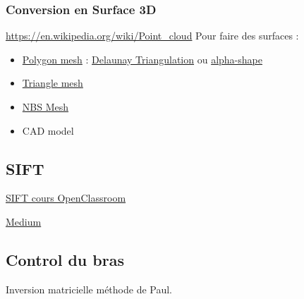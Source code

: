 \documentclass[12pt,a4paper]{article}
\begin{document}
\subsubsection{Conversion en Surface 3D}
\url{https://en.wikipedia.org/wiki/Point_cloud}
Pour faire des surfaces : 
\begin{itemize}
\item \href{https://en.wikipedia.org/wiki/Polygon_mesh}{Polygon mesh} : \href{https://en.wikipedia.org/wiki/Delaunay_triangulation}{Delaunay Triangulation} ou \href{https://en.wikipedia.org/wiki/Alpha_shape}{alpha-shape}
\item \href{https://en.wikipedia.org/wiki/Triangle_mesh}{Triangle mesh}
\item \href{https://en.wikipedia.org/wiki/Non-uniform_rational_B-spline}{NBS Mesh}
\item CAD model
\end{itemize}

\subsection{SIFT}
\href{https://openclassrooms.com/fr/courses/4470531-classez-et-segmentez-des-donnees-visuelles/5053196-decrivez-efficacement-les-features-detectees-avec-sift}{SIFT cours OpenClassroom}  

\href{https://medium.com/data-breach/introduction-to-sift-scale-invariant-feature-transform-65d7f3a72d40}{Medium}

\subsection{Control du bras}
Inversion matricielle méthode de Paul.
\end{document}
